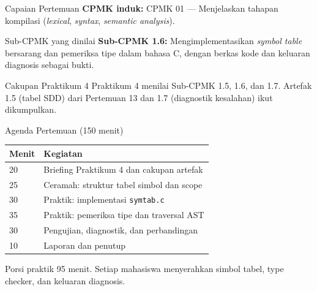 \documentclass[aspectratio=169,10pt,t]{beamer}
\begin{document}

\begin{frame}{Capaian Pertemuan}
  \textbf{CPMK induk:} CPMK 01 --- Menjelaskan tahapan kompilasi
  (\textit{lexical}, \textit{syntax}, \textit{semantic analysis}).

  \vspace{3pt}
  \begin{block}{Sub-CPMK yang dinilai}
    \small
    \textbf{Sub-CPMK 1.6:} Mengimplementasikan \textit{symbol table}
    bersarang dan pemeriksa tipe dalam bahasa C, dengan berkas kode
    dan keluaran diagnosis sebagai bukti.
  \end{block}

  \vspace{3pt}
  \begin{exampleblock}{Cakupan Praktikum 4}
    \footnotesize
    Praktikum 4 menilai Sub-CPMK 1.5, 1.6, dan 1.7. Artefak 1.5
    (tabel SDD) dari Pertemuan 13 dan 1.7 (diagnostik kesalahan) ikut
    dikumpulkan.
  \end{exampleblock}
\end{frame}

\begin{frame}{Agenda Pertemuan (150 menit)}
  \small
  \begin{tabular}{@{}p{1.4cm}p{12.3cm}@{}}
    \toprule
    \textbf{Menit} & \textbf{Kegiatan} \\
    \midrule
    20 & Briefing Praktikum 4 dan cakupan artefak \\
    25 & Ceramah: struktur tabel simbol dan scope \\
    30 & Praktik: implementasi \texttt{symtab.c} \\
    35 & Praktik: pemeriksa tipe dan traversal AST \\
    30 & Pengujian, diagnostik, dan perbandingan \\
    10 & Laporan dan penutup \\
    \bottomrule
  \end{tabular}

  \vspace{6pt}
  {\scriptsize\color{ubbblue!75}Porsi praktik 95 menit. Setiap
  mahasiswa menyerahkan simbol tabel, type checker, dan keluaran
  diagnosis.}
\end{frame}
\end{document}
